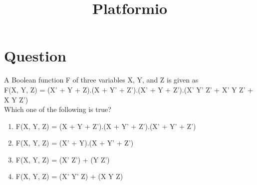 \documentclass[journal,12pt]{IEEEtran}
\begin{document}
\onecolumn

\title{Platformio}
\author{}
\maketitle
\tableofcontents
\vspace{10pt}
\section{Question}
\vspace{10pt}
\begin{flushleft}
A Boolean function F of three variables X, Y, and Z is given as 
\vspace{3pt}
\\F(X, Y, Z) = (X' + Y + Z).(X + Y' + Z').(X' + Y + Z').(X' Y' Z' + X' Y Z' + X Y Z')\\
\vspace{3pt}
Which one of the following is true?
\end{flushleft}
\begin{enumerate}[label=\roman*.,labelindent=\parindent,leftmargin=*]
    \item F(X, Y, Z) = (X + Y + Z').(X + Y' + Z').(X' + Y' + Z')
    \vspace{1pt}
    \item F(X, Y, Z) = (X' + Y).(X + Y' + Z')
    \vspace{1pt}
    \item F(X, Y, Z) = (X' Z') + (Y Z')
    \vspace{1pt}
    \item F(X, Y, Z) = (X' Y' Z) + (X Y Z)
\end{enumerate}
\end{document}

